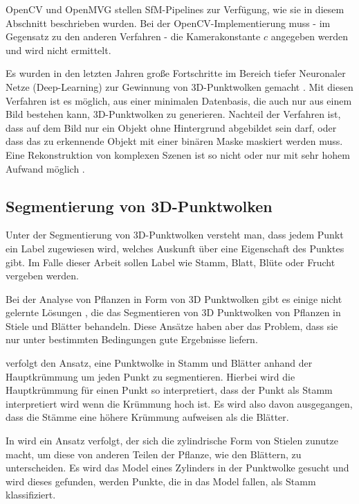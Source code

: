 \documentclass[12pt,titlepage, twoside]{article}
\begin{document}
OpenCV und OpenMVG stellen SfM-Pipelines zur Verfügung, wie sie in diesem Abschnitt beschrieben wurden. 
Bei der OpenCV-Implementierung muss - im Gegensatz zu den anderen Verfahren - die Kamerakonstante $c$ angegeben werden und wird nicht ermittelt.

Es wurden in den letzten Jahren große Fortschritte im Bereich tiefer Neuronaler Netze (Deep-Learning) \cite{lecun2015deep} zur Gewinnung von 3D-Punktwolken gemacht \cite{fan2016point} \cite{tatarchenko2017octree} \cite{wang2018pixel2mesh}. 
Mit diesen Verfahren ist es möglich, aus einer minimalen Datenbasis, die auch nur aus einem Bild bestehen kann, 3D-Punktwolken zu generieren.
Nachteil der Verfahren ist, dass auf dem Bild nur ein Objekt ohne Hintergrund abgebildet sein darf, oder dass das zu erkennende Objekt mit einer binären Maske maskiert werden muss.
Eine Rekonstruktion von komplexen Szenen ist so nicht oder nur mit sehr hohem Aufwand möglich \cite{rs11222644}. %

\subsection{Segmentierung von 3D-Punktwolken}
\label{sec:stand:segmentierung}

Unter der Segmentierung von 3D-Punktwolken versteht man, dass jedem Punkt ein Label zugewiesen wird, welches Auskunft über eine Eigenschaft des Punktes gibt.
Im Falle dieser Arbeit sollen Label wie Stamm, Blatt, Blüte oder Frucht vergeben werden.

Bei der Analyse von Pflanzen in Form von 3D Punktwolken gibt es einige nicht gelernte Lösungen \cite{ThreeBasics} \cite{ModelBased}, die das Segmentieren von 3D Punktwolken von Pflanzen in Stiele und Blätter behandeln. 
Diese Ansätze haben aber das Problem, dass sie nur unter bestimmten Bedingungen gute Ergebnisse liefern.

\cite{ThreeBasics} verfolgt den Ansatz, eine Punktwolke in Stamm und Blätter anhand der Hauptkrümmung um jeden Punkt zu segmentieren. 
Hierbei wird die Hauptkrümmung für einen Punkt so interpretiert, dass der Punkt als Stamm interpretiert wird wenn die Krümmung hoch ist. 
Es wird also davon ausgegangen, dass die Stämme eine höhere Krümmung aufweisen als die Blätter. 

In \cite{ModelBased} wird ein Ansatz verfolgt, der sich die zylindrische Form von Stielen zunutze macht, um diese von anderen Teilen der Pflanze, wie den Blättern, zu unterscheiden. 
Es wird das Model eines Zylinders in der Punktwolke gesucht und wird dieses gefunden, werden Punkte, die in das Model fallen, als Stamm klassifiziert.
\end{document}

